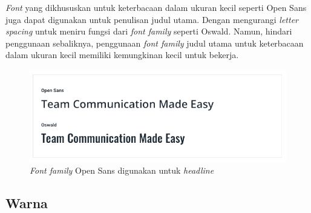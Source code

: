 \textit{Font} yang dikhususkan untuk keterbacaan dalam ukuran kecil seperti Open Sans juga dapat digunakan untuk penulisan judul utama. Dengan mengurangi \textit{letter spacing} untuk meniru fungsi dari \textit{font family} seperti Oswald. Namun, hindari penggunaan sebaliknya, penggunaan \textit{font family} judul utama untuk keterbacaan dalam ukuran kecil memiliki kemungkinan kecil untuk bekerja.  

\begin{figure}[H]
	{\centering
		\includegraphics[keepaspectratio, width=12cm]{gambar/refactoring-ui-g22.png}
		\caption{\textit{Font family} Open Sans digunakan untuk \textit{headline} \citep{refactoringui}}}
	\label{gambar:refactoring-ui-g23.png}
\end{figure}

\subsection{Warna}
